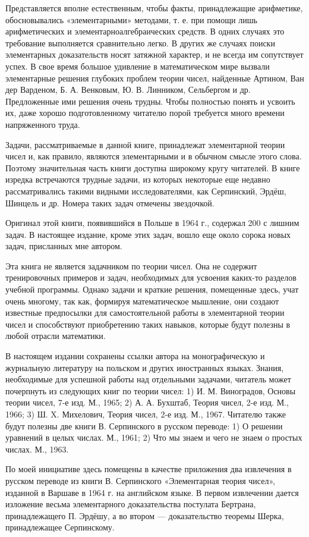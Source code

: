 \documentclass[12pt, a4paper, openany]{book}
\begin{document}
Представляется вполне естественным, чтобы факты, принадлежащие арифметике, обосновывались «элементарными» методами, т. е. при помощи лишь арифметических и элементарноалгебраических средств. В одних случаях это требование выполняется сравнительно легко. В других же случаях поиски элементарных доказательств носят затяжной характер, и не всегда им сопутствует успех. В свое время большое удивление в математическом мире вызвали элементарные решения глубоких проблем теории чисел, найденные Артином, Ван дер Варденом, Б. А. Венковым, Ю. В. Линником, Сельбергом и др. Предложенные ими решения очень трудны. Чтобы полностью понять и усвоить их, даже хорошо подготовленному читателю порой требуется много времени напряженного труда.

Задачи, рассматриваемые в данной книге, принадлежат элементарной теории чисел и, как правило, являются элементарными и в обычном смысле этого слова. Поэтому значительная часть книги доступна широкому кругу читателей. В книге изредка встречаются трудные задачи, из которых некоторые еще недавно рассматривались такими видными исследователями, как Серпинский, Эрдёш, Шинцель и др. Номера таких задач отмечены звездочкой.

Оригинал этой книги, появившийся в Польше в 1964 г., содержал 200 с лишним задач. В настоящее издание, кроме этих задач, вошло еще около сорока новых задач, присланных мне автором.

Эта книга не является задачником по теории чисел. Она не содержит тренировочных примеров и задач, необходимых для усвоения каких-то разделов учебной программы. Однако задачи и краткие решения, помещенные здесь, учат очень многому, так как, формируя математическое мышление, они создают известные предпосылки для самостоятельной работы в элементарной теории чисел и способствуют приобретению таких навыков, которые будут полезны в любой отрасли математики.


В настоящем издании сохранены ссылки автора на монографическую и журнальную литературу на польском и других иностранных языках. Знания, необходимые для успешной работы над отдельными задачами, читатель может почерпнуть из следующих книг по теории чисел: 1) И. М. Виноградов, Основы теории чисел, 7-е изд. М., 1965; 2) А. А. Бухштаб, Теория чисел, 2-е изд. М., 1966; 3) Ш. X. Михелович, Теория чисел, 2-е изд. М., 1967. Читателю также будут полезны две книги В. Серпинского в русском переводе: 1) О решении уравнений в целых числах. М., 1961; 2) Что мы знаем и чего не знаем о простых числах. М., 1963.

По моей инициативе здесь помещены в качестве приложения два извлечения в русском переводе из книги В. Серпинского «Элементарная теория чисел», изданной в Варшаве в 1964 г. на английском языке. В первом извлечении дается изложение весьма элементарного доказательства постулата Бертрана, принадлежащего П. Эрдёшу, а во втором — доказательство теоремы Шерка, принадлежащее Серпинскому.
\end{document}
